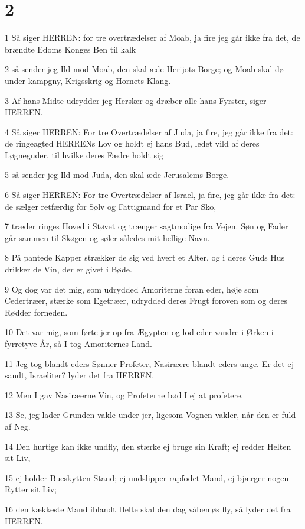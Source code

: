 \chapter{2}

\par 1 Så siger HERREN: for tre overtrædelser af Moab, ja fire jeg går ikke fra det, de brændte Edoms Konges Ben til kalk
\par 2 så sender jeg Ild mod Moab, den skal æde Herijots Borge; og Moab skal dø under kampgny, Krigsskrig og Hornets Klang.
\par 3 Af hans Midte udrydder jeg Hersker og dræber alle hans Fyrster, siger HERREN.
\par 4 Så siger HERREN: For tre Overtrædelser af Juda, ja fire, jeg går ikke fra det: de ringeagted HERRENs Lov og holdt ej hans Bud, ledet vild af deres Løgneguder, til hvilke deres Fædre holdt sig
\par 5 så sender jeg Ild mod Juda, den skal æde Jerusalems Borge.
\par 6 Så siger HERREN: For tre Overtrædelser af Israel, ja fire, jeg går ikke fra det: de sælger retfærdig for Sølv og Fattigmand for et Par Sko,
\par 7 træder ringes Hoved i Støvet og trænger sagtmodige fra Vejen. Søn og Fader går sammen til Skøgen og søler således mit hellige Navn.
\par 8 På pantede Kapper strækker de sig ved hvert et Alter, og i deres Guds Hus drikker de Vin, der er givet i Bøde.
\par 9 Og dog var det mig, som udrydded Amoriterne foran eder, høje som Cedertræer, stærke som Egetræer, udrydded deres Frugt foroven som og deres Rødder forneden.
\par 10 Det var mig, som førte jer op fra Ægypten og lod eder vandre i Ørken i fyrretyve År, så I tog Amoriternes Land.
\par 11 Jeg tog blandt eders Sønner Profeter, Nasiræere blandt eders unge. Er det ej sandt, Israeliter? lyder det fra HERREN.
\par 12 Men I gav Nasiræerne Vin, og Profeterne bød I ej at profetere.
\par 13 Se, jeg lader Grunden vakle under jer, ligesom Vognen vakler, når den er fuld af Neg.
\par 14 Den hurtige kan ikke undfly, den stærke ej bruge sin Kraft; ej redder Helten sit Liv,
\par 15 ej holder Bueskytten Stand; ej undslipper rapfodet Mand, ej bjærger nogen Rytter sit Liv;
\par 16 den kækkeste Mand iblandt Helte skal den dag våbenløs fly, så lyder det fra HERREN.

